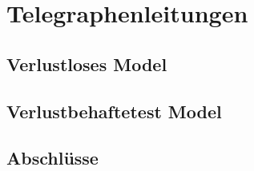 \documentclass[paper=a4, parskip=half-, ngerman, fontsize=11pt]{scrreprt}
\begin{document}
\chapter{Telegraphenleitungen}

\section{Verlustloses Model}

\section{Verlustbehaftetest Model}

\section{Abschlüsse}


\printbibliography
\end{document}
